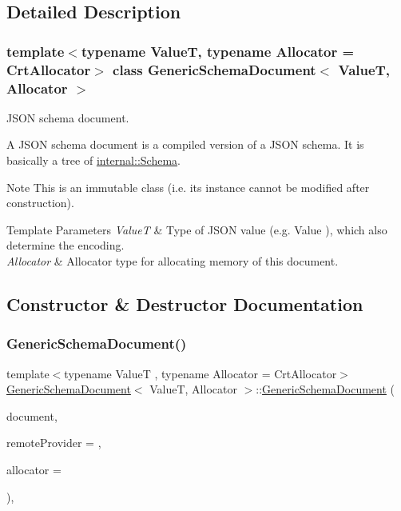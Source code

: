 \subsection{Detailed Description}
\subsubsection*{template$<$typename ValueT, typename Allocator = Crt\+Allocator$>$\newline
class Generic\+Schema\+Document$<$ Value\+T, Allocator $>$}

J\+S\+ON schema document. 

A J\+S\+ON schema document is a compiled version of a J\+S\+ON schema. It is basically a tree of \hyperlink{classinternal_1_1_schema}{internal\+::\+Schema}.

\begin{DoxyNote}{Note}
This is an immutable class (i.\+e. its instance cannot be modified after construction). 
\end{DoxyNote}

\begin{DoxyTemplParams}{Template Parameters}
{\em ValueT} & Type of J\+S\+ON value (e.\+g. {\ttfamily Value} ), which also determine the encoding. \\
\hline
{\em Allocator} & Allocator type for allocating memory of this document. \\
\hline
\end{DoxyTemplParams}


\subsection{Constructor \& Destructor Documentation}
\mbox{\label{class_generic_schema_document_a5577c9b9a7a898207a50db891388231c}} 
\subsubsection{\texorpdfstring{Generic\+Schema\+Document()}{GenericSchemaDocument()}}
{\footnotesize\ttfamily template$<$typename ValueT , typename Allocator  = Crt\+Allocator$>$ \\
\hyperlink{class_generic_schema_document}{Generic\+Schema\+Document}$<$ ValueT, Allocator $>$\+::\hyperlink{class_generic_schema_document}{Generic\+Schema\+Document} (\begin{DoxyParamCaption}\item[{const Value\+Type \&}]{document,  }\item[{\hyperlink{class_i_generic_remote_schema_document_provider}{I\+Remote\+Schema\+Document\+Provider\+Type} $\ast$}]{remote\+Provider = {},  }\item[{Allocator $\ast$}]{allocator = {} }\end{DoxyParamCaption})\hspace{0.3cm}{\ttfamily [inline]}, {\ttfamily [explicit]}}



